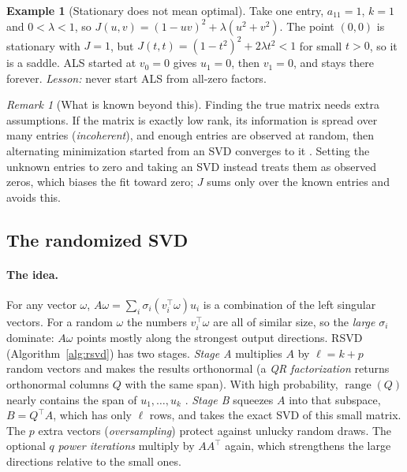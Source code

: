 \documentclass[10pt]{article}
\theoremstyle{plain}
\theoremstyle{definition}
\newtheorem{example}[theorem]{Example}
\theoremstyle{remark}
\newtheorem{remark}[theorem]{Remark}
\newcommand{\T}{^{\top}}
\DeclareMathOperator{\range}{range}
\begin{document}
\begin{example}[Stationary does not mean optimal]\label{ex:saddle}
Take one entry, $a_{11}=1$, $k=1$ and $0<\lambda<1$, so $J(u,v)=(1-uv)^2+\lambda(u^2+v^2)$. The point $(0,0)$ is stationary with $J=1$, but $J(t,t)=(1-t^2)^2+2\lambda t^2<1$ for small $t>0$, so it is a saddle. ALS started at $v_0=0$ gives $u_1=0$, then $v_1=0$, and stays there forever. \emph{Lesson:} never start ALS from all-zero factors.
\end{example}

\begin{remark}[What is known beyond this]\label{rem:alsknown}
Finding the true matrix needs extra assumptions. If the matrix is exactly low rank, its information is spread over many entries (\emph{incoherent}), and enough entries are observed at random, then alternating minimization started from an SVD converges to it \cite{jain2013,hardt2014}. Setting the unknown entries to zero and taking an SVD instead treats them as observed zeros, which biases the fit toward zero; $J$ sums only over the known entries and avoids this.
\end{remark}

\subsection{The randomized SVD}
\label{sec:rsvd}

\paragraph{The idea.}
For any vector $\omega$, $A\omega=\sum_i\sigma_i(v_i\T\omega)u_i$ is a combination of the left singular vectors. For a random $\omega$ the numbers $v_i\T\omega$ are all of similar size, so the \emph{large} $\sigma_i$ dominate: $A\omega$ points mostly along the strongest output directions. RSVD (Algorithm~\ref{alg:rsvd}) has two stages. \emph{Stage A} multiplies $A$ by $\ell=k+p$ random vectors and makes the results orthonormal (a \emph{QR factorization} returns orthonormal columns $Q$ with the same span). With high probability, $\range(Q)$ nearly contains the span of $u_1,\dots,u_k$ \cite{halko2011}. \emph{Stage B} squeezes $A$ into that subspace, $B=Q\T A$, which has only $\ell$ rows, and takes the exact SVD of this small matrix. The $p$ extra vectors (\emph{oversampling}) protect against unlucky random draws. The optional $q$ \emph{power iterations} multiply by $AA\T$ again, which strengthens the large directions relative to the small ones.
\end{document}
